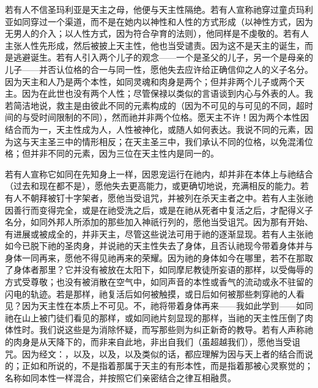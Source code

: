 若有人不信圣玛利亚是天主之母，他便与天主性隔绝。若有人宣称祂穿过童贞玛利亚如同穿过一个渠道，而不是在她内以神性和人性的方式形成（以神性方式，因为无男人的介入；以人性方式，因为符合孕育的法则），他同样是不虔敬的。若有人主张人性先形成，然后被披上天主性，他也当受谴责。因为这不是天主的诞生，而是逃避诞生。若有人引入两个儿子的观念——一个是圣父的儿子，另一个是母亲的儿子——并否认位格的合一与同一性，愿他失去应许给正确信仰之人的义子名分。因为天主和人乃是两个本性，如同灵魂和肉身是两个；但并非两个儿子或两个天主。因为在此世也没有两个人性；尽管保禄以类似的言语谈到内心与外表的人。我若简洁地说，救主是由彼此不同的元素构成的（因为不可见的与可见的不同，超时间的与受时间限制的不同），然而祂并非两个位格。愿天主不许！因为两个本性因结合而为一，天主性成为人，人性被神化，或随人如何表达。我说不同的元素，因为这与天主圣三中的情形相反；在天主圣三中，我们承认不同的位格，以免混淆位格；但并非不同的元素，因为三位在天主性内是同一的。\par

若有人宣称它如同在先知身上一样，因恩宠运行在祂内，却并非在本体上与祂结合（过去和现在都不是），愿他失去更高能力，或更确切地说，充满相反的能力。若有人不朝拜被钉十字架者，愿他当受诅咒，并被列在杀天主者之中。若有人主张祂因善行而变得完全，或是在祂受洗之后，或是在祂从死者中复活之后，才配得义子名分，如同外邦人所添加的那些加入神祇行列的，愿他当受诅咒。因为那有开始、有进展或被成全的，并非天主，尽管这些说法可用于祂的逐渐显现。若有人主张祂如今已脱下祂的圣肉身，并说祂的天主性失去了身体，且否认祂现今带着身体并与身体一同再来，愿他不得见祂再来的荣耀。因为祂的身体如今在哪里，若不在那取了身体者那里？它并没有被放在太阳下，如同摩尼教徒所妄语的那样，以受侮辱的方式受尊敬；也没有被消散在空气中，如同声音的本性或香气的流动或永不驻留的闪电的轨迹。若是那样，祂复活后如何被触摸，或日后如何被那些刺穿祂的人看见？因为天主性在本质上不可见。不，祂将带着身体再来——我如此学到——如同祂在山上被门徒们看见的那样，或如同祂片刻显现的那样，当祂的天主性压倒了肉体性时。我们说这些是为消除怀疑，而写那些则为纠正新奇的教导。若有人声称祂的肉身是从天降下的，而非来自此地，非出自我们（虽超越我们），愿他当受诅咒。因为经文：，以及，以及，以及类似的话，都应理解为因与天上者的结合而说的；正如和所说的，不是指着那属于天主的有形本性，而是指着那被心灵察觉的；名称如同本性一样混合，并按照它们亲密结合之律互相融贯。\par

